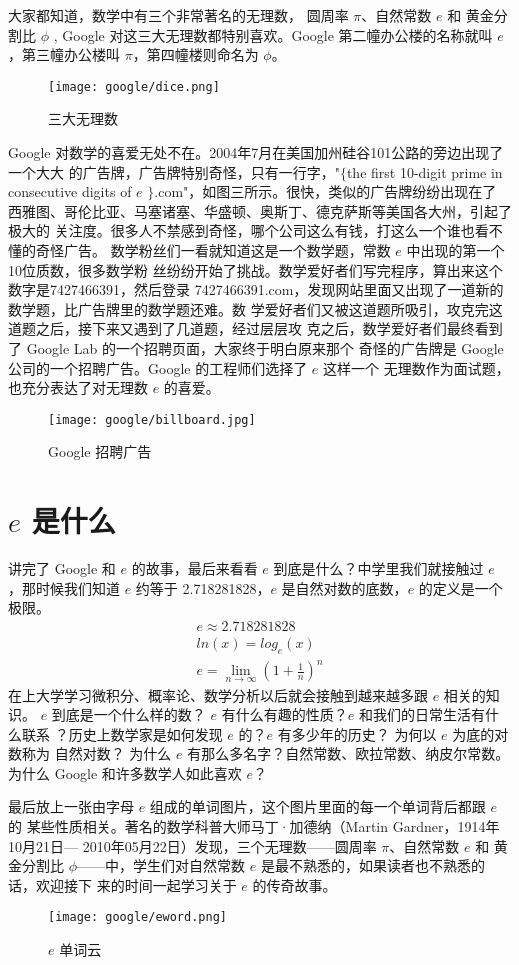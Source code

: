 大家都知道，数学中有三个非常著名的无理数， 圆周率 $\pi$、自然常数 $e$ 和 黄金分
割比 $\phi$ , Google 对这三大无理数都特别喜欢。Google 第二幢办公楼的名称就叫
$e$，第三幢办公楼叫 $\pi$，第四幢楼则命名为 $\phi$。
\begin{figure}[htbp]
\centering
\texttt{[image: google/dice.png]}
\caption{三大无理数}
\centering
\end{figure}

Google 对数学的喜爱无处不在。2004年7月在美国加州硅谷101公路的旁边出现了一个大大
的广告牌，广告牌特别奇怪，只有一行字，"$\{$the first 10-digit prime in
consecutive digits of $e$ $\}$.com"，如图三所示。很快，类似的广告牌纷纷出现在了
西雅图、哥伦比亚、马塞诸塞、华盛顿、奥斯丁、德克萨斯等美国各大州，引起了极大的
关注度。很多人不禁感到奇怪，哪个公司这么有钱，打这么一个谁也看不懂的奇怪广告。
数学粉丝们一看就知道这是一个数学题，常数 $e$ 中出现的第一个10位质数，很多数学粉
丝纷纷开始了挑战。数学爱好者们写完程序，算出来这个数字是7427466391，然后登录
7427466391.com，发现网站里面又出现了一道新的数学题，比广告牌里的数学题还难。数
学爱好者们又被这道题所吸引，攻克完这道题之后，接下来又遇到了几道题，经过层层攻
克之后，数学爱好者们最终看到了 Google Lab 的一个招聘页面，大家终于明白原来那个
奇怪的广告牌是 Google 公司的一个招聘广告。Google 的工程师们选择了 $e$ 这样一个
无理数作为面试题，也充分表达了对无理数 $e$ 的喜爱。
\begin{figure}[htbp]
\centering
\texttt{[image: google/billboard.jpg]}
\caption{Google 招聘广告}
\centering
\end{figure}
	
\section{$e$ 是什么}
讲完了 Google 和 $e$ 的故事，最后来看看 $e$ 到底是什么？中学里我们就接触过 $e$
，那时候我们知道 $e$ 约等于 2.718281828，$e$ 是自然对数的底数，$e$ 的定义是一个
极限。
\begin{equation}
\nonumber
\begin{split}
e \approx 2.718281828 \\
ln(x) = log_{e}(x) \\
e = \lim_{n \to \infty}(1+\frac{1}{n})^n
\end{split}
\end{equation}
在上大学学习微积分、概率论、数学分析以后就会接触到越来越多跟 $e$ 相关的知识。
$e$ 到底是一个什么样的数？ $e$ 有什么有趣的性质？$e$ 和我们的日常生活有什么联系
？历史上数学家是如何发现 $e$ 的？$e$ 有多少年的历史？ 为何以 $e$ 为底的对数称为
自然对数？ 为什么 $e$ 有那么多名字？自然常数、欧拉常数、纳皮尔常数。为什么
Google 和许多数学人如此喜欢 $e$？

最后放上一张由字母 $e$ 组成的单词图片，这个图片里面的每一个单词背后都跟 $e$ 的
某些性质相关。著名的数学科普大师马丁·加德纳（Martin Gardner，1914年10月21日—
2010年05月22日）发现，三个无理数——圆周率 $\pi$、自然常数 $e$ 和 黄金分割比
$\phi$——中，学生们对自然常数 $e$ 是最不熟悉的，如果读者也不熟悉的话，欢迎接下
来的时间一起学习关于 $e$ 的传奇故事。
\begin{figure}[htbp]
\centering
\texttt{[image: google/eword.png]}
\caption{$e$ 单词云}
\centering
\end{figure}


